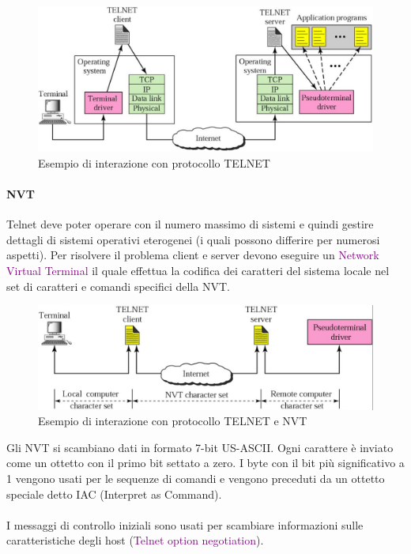 \begin{figure}[h]
    \centering
    \includegraphics[scale=0.27]{Immagini/Schema_Telnet.png}
    \caption{Esempio di interazione con protocollo TELNET}
\end{figure}

\newblock

\paragraph{NVT} Telnet deve poter operare con il numero massimo di sistemi e quindi gestire dettagli di sistemi operativi eterogenei (i quali possono differire per numerosi aspetti).
Per risolvere il problema client e server devono eseguire un \textcolor{purple}{Network Virtual Terminal} il quale effettua la codifica dei caratteri del sistema locale nel set di caratteri e comandi specifici della NVT.
\begin{figure}[h]
    \centering
    \includegraphics[scale=0.27]{Immagini/Telnet_NVT.png}
    \caption{Esempio di interazione con protocollo TELNET e NVT}
\end{figure}

Gli NVT si scambiano dati in formato 7-bit US-ASCII. Ogni carattere è inviato come un ottetto con il primo bit settato a zero.
I byte con il bit più significativo a 1 vengono usati per le sequenze di comandi e vengono preceduti da un ottetto speciale detto IAC (Interpret as Command).
\\ \\ I messaggi di controllo iniziali sono usati per scambiare informazioni sulle caratteristiche degli host (\textcolor{purple}{Telnet option negotiation}).

